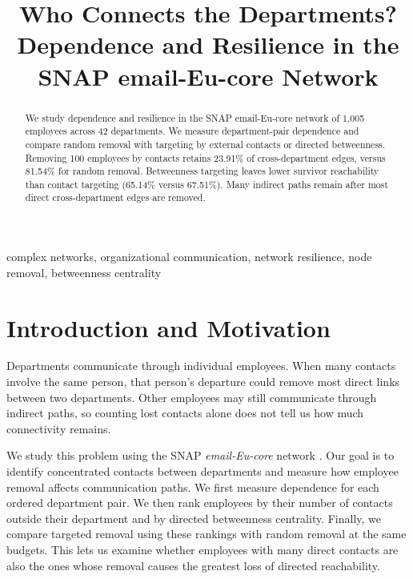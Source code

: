 \documentclass[conference]{IEEEtran}
\begin{document}
\title{Who Connects the Departments?\\Dependence and Resilience in the SNAP email-Eu-core Network}

\author{
\and
{}
}

\maketitle

\begin{abstract}
We study dependence and resilience in the SNAP email-Eu-core network of 1,005 employees across 42 departments. We measure department-pair dependence and compare random removal with targeting by external contacts or directed betweenness. Removing 100 employees by contacts retains 23.91\% of cross-department edges, versus 81.54\% for random removal. Betweenness targeting leaves lower survivor reachability than contact targeting (65.14\% versus 67.51\%). Many indirect paths remain after most direct cross-department edges are removed.
\end{abstract}

\begin{IEEEkeywords}
complex networks, organizational communication, network resilience, node removal, betweenness centrality
\end{IEEEkeywords}

\section{Introduction and Motivation}
Departments communicate through individual employees. When many contacts involve the same person, that person's departure could remove most direct links between two departments. Other employees may still communicate through indirect paths, so counting lost contacts alone does not tell us how much connectivity remains.

We study this problem using the SNAP \textit{email-Eu-core} network \cite{snap-email}. Our goal is to identify concentrated contacts between departments and measure how employee removal affects communication paths. We first measure dependence for each ordered department pair. We then rank employees by their number of contacts outside their department and by directed betweenness centrality. Finally, we compare targeted removal using these rankings with random removal at the same budgets. This lets us examine whether employees with many direct contacts are also the ones whose removal causes the greatest loss of directed reachability.
\end{document}
